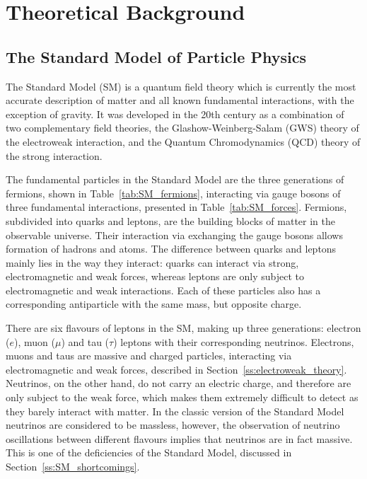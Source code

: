 
\chapter{Theoretical Background}
\label{c:theory}

\ifpdf
    \graphicspath{{02_Theory/plots/}}
\else
    \graphicspath{{02_Theory/plots/EPS/}{02_Theory/plots/}}
\fi

\section{The Standard Model of Particle Physics}
\label{s:SM}
The Standard Model (SM) is a quantum field theory which is currently the most accurate description of matter and all
known fundamental interactions, with the exception of gravity. It was developed in the 20th century as a combination of
two complementary field theories, the Glashow-Weinberg-Salam (GWS) \autocite{Glashow, Weinberg, Salam} theory of the
electroweak interaction, and the Quantum Chromodynamics (QCD) \autocite{Gell-Mann_1964, Gross_Wilczek, Politzer} theory
of the strong interaction.

The fundamental particles in the Standard Model are the three generations of fermions, shown in
Table~\ref{tab:SM_fermions}, interacting via gauge bosons of three fundamental interactions, presented in
Table~\ref{tab:SM_forces}. Fermions, subdivided into quarks and leptons, are the building blocks of matter in the
observable universe. Their interaction via exchanging the gauge bosons allows formation of hadrons and atoms. The
difference between quarks and leptons mainly lies in the way they interact: quarks can interact via strong,
electromagnetic and weak forces, whereas leptons are only subject to electromagnetic and weak interactions. Each of
these particles also has a corresponding antiparticle with the same mass, but opposite charge.

There are six flavours of leptons in the SM, making up three generations: electron ($e$), muon ($\mu$) and tau ($\tau$)
leptons with their corresponding neutrinos. Electrons, muons and taus are massive and charged particles, interacting via
electromagnetic and weak forces, described in Section~\ref{ss:electroweak_theory}. Neutrinos, on the other hand, do not
carry an electric charge, and therefore are only subject to the weak force, which makes them extremely difficult to
detect as they barely interact with matter. In the classic version of the Standard Model neutrinos are considered to be
massless, however, the observation of neutrino oscillations between different flavours \autocite{neutrino_oscillations}
implies that neutrinos are in fact massive. This is one of the deficiencies of the Standard Model, discussed in
Section~\ref{ss:SM_shortcomings}.

